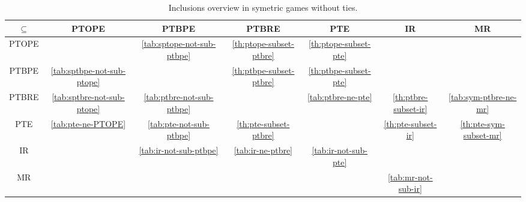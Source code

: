 \begin{sidewaystable}
	\caption{Inclusions overview in symetric games without ties.}
	\begin{tabular}{|c|c|c|c|c|c|c|}
		\hline
		$\subseteq$  & PTOPE & PTBPE & PTBRE & PTE & IR & MR \\
		\hline
		PTOPE & \cellcolor{gray!30} & \cellcolor{red!30} \autoref{tab:sptope-not-sub-ptbpe} & \cellcolor{green!30} \autoref{th:ptope-subset-ptbre} & \cellcolor{green!30} \autoref{th:ptope-subset-pte} & \cellcolor{green!15} & \cellcolor{green!15} \\
		\hline
		PTBPE & \cellcolor{red!30} \autoref{tab:sptbpe-not-sub-ptope} & \cellcolor{gray!30} & \cellcolor{green!30} \autoref{th:ptbpe-subset-ptbre} & \cellcolor{green!30} \autoref{th:ptbpe-subset-pte} & \cellcolor{green!15} & \cellcolor{green!15} \\
		\hline
		PTBRE & \cellcolor{red!30} \autoref{tab:sptbre-not-sub-ptope} & \cellcolor{red!30} \autoref{tab:ptbre-not-sub-ptbpe} & \cellcolor{gray!30} & \cellcolor{red!30} \autoref{tab:ptbre-ne-pte} & \cellcolor{green!30} \autoref{th:ptbre-subset-ir} & \cellcolor{red!30} \autoref{tab:sym-ptbre-ne-mr} \\
		\hline
		PTE & \cellcolor{red!30} \autoref{tab:pte-ne-PTOPE} & \cellcolor{red!30} \autoref{tab:pte-not-sub-ptbpe} & \cellcolor{green!30} \autoref{th:pte-subset-ptbre} & \cellcolor{gray!30} & \cellcolor{green!30} \autoref{th:pte-subset-ir} & \cellcolor{green!30} \autoref{th:pte-sym-subset-mr} \\
		\hline
		IR & \cellcolor{red!15} & \cellcolor{red!30} \autoref{tab:ir-not-sub-ptbpe} & \cellcolor{red!30} \autoref{tab:ir-ne-ptbre} & \cellcolor{red!30} \autoref{tab:ir-not-sub-pte} & \cellcolor{gray!30} & \cellcolor{red!15} \\
		\hline
		MR & \cellcolor{red!15} & \cellcolor{red!15} & \cellcolor{red!15} & \cellcolor{red!15} & \cellcolor{red!30} \autoref{tab:mr-not-sub-ir} & \cellcolor{gray!30} \\
		\hline
		\end{tabular}
\end{sidewaystable}
